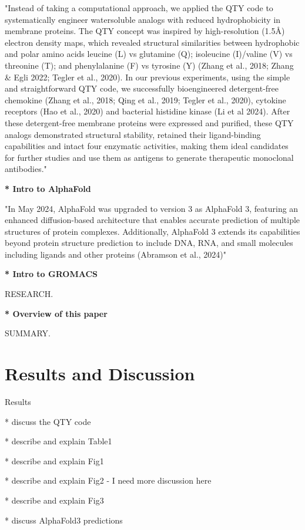 \documentclass[fleqn,10pt,lineno]{manuscript}
\begin{document}
"Instead of taking a computational approach, we applied the QTY code to systematically engineer watersoluble analogs with reduced hydrophobicity in membrane proteins. The QTY concept was inspired by high-resolution (1.5\AA) electron density maps, which revealed structural similarities between hydrophobic and polar amino acids leucine (L) vs glutamine (Q); isoleucine (I)/valine (V) vs threonine (T); and phenylalanine (F) vs tyrosine (Y) (Zhang et al., 2018; Zhang \& Egli 2022; Tegler et al., 2020). In our previous experiments, using the simple and straightforward QTY code, we successfully bioengineered detergent-free chemokine (Zhang et al., 2018; Qing et al., 2019; Tegler et al., 2020), cytokine receptors (Hao et al., 2020) and bacterial histidine kinase (Li et al 2024). After these detergent-free membrane proteins were expressed and purified, these QTY analogs demonstrated structural stability, retained their ligand-binding capabilities and intact four enzymatic activities, making them ideal candidates for further studies and use them as antigens to generate therapeutic monoclonal antibodies."

\textbf{* Intro to AlphaFold}

"In May 2024, AlphaFold was upgraded to version 3 as AlphaFold 3, featuring an enhanced diffusion-based architecture that enables accurate prediction of multiple structures of protein complexes. Additionally, AlphaFold 3 extends its capabilities beyond protein structure prediction to include DNA, RNA, and small molecules including ligands and other proteins (Abramson et al., 2024)"

\textbf{* Intro to GROMACS}

RESEARCH. 

\textbf{* Overview of this paper}

SUMMARY.

\section*{Results and Discussion}

Results

* discuss the QTY code

* describe and explain Table1

* describe and explain Fig1

* describe and explain Fig2
	- I need more discussion here

* describe and explain Fig3

* discuss AlphaFold3 predictions
\end{document}
